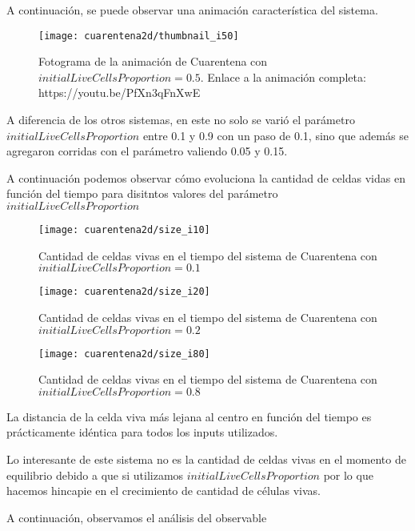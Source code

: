 A continuación, se puede observar una animación característica del sistema.

\begin{figure}[H]
    \centering
    \texttt{[image: cuarentena2d/thumbnail\_i50]}
    \caption{Fotograma de la animación de Cuarentena con $initialLiveCellsProportion = 0.5$. Enlace a la animación completa: https://youtu.be/PfXn3qFnXwE}
    \label{fig:thumbnailcuarentena2d_i50}
\end{figure}

A diferencia de los otros sistemas, en este no solo se varió el parámetro $initialLiveCellsProportion$ entre 0.1 y 0.9 con un paso de 0.1, 
sino que además se agregaron corridas con el parámetro valiendo 0.05 y 0.15.

A continuación podemos observar cómo evoluciona la cantidad de celdas vidas en función del tiempo para disitntos valores del parámetro $initialLiveCellsProportion$

\begin{figure}[H]
    \centering
    \texttt{[image: cuarentena2d/size\_i10]}
    \caption{Cantidad de celdas vivas en el tiempo del sistema de Cuarentena con $initialLiveCellsProportion = 0.1$}
    \label{fig:cuarentena2d_i10}
\end{figure}
\begin{figure}[H]
    \centering
    \texttt{[image: cuarentena2d/size\_i20]}
    \caption{Cantidad de celdas vivas en el tiempo del sistema de Cuarentena con $initialLiveCellsProportion = 0.2$}
    \label{fig:cuarentena2d_i20}
\end{figure}
\begin{figure}[H]
    \centering
    \texttt{[image: cuarentena2d/size\_i80]}
    \caption{Cantidad de celdas vivas en el tiempo del sistema de Cuarentena con $initialLiveCellsProportion = 0.8$}
    \label{fig:cuarentena2d_i80}
\end{figure}

La distancia de la celda viva más lejana al centro en función del tiempo es prácticamente idéntica para todos los inputs utilizados.

Lo interesante de este sistema no es la cantidad de celdas vivas en el momento de equilibrio debido a que si utilizamos $initialLiveCellsProportion$
por lo que hacemos hincapie en el crecimiento de cantidad de células vivas.

A continuación, observamos el análisis del observable

